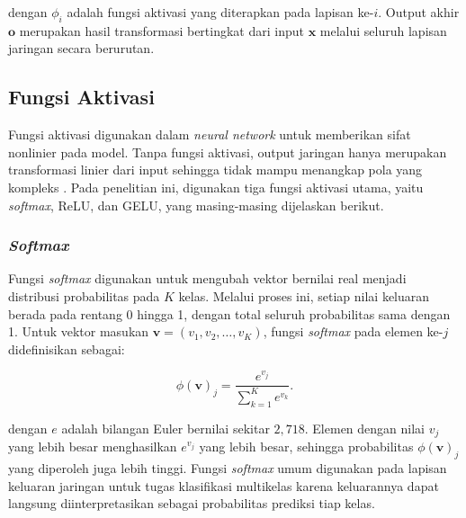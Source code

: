 \noindent dengan $\phi_i$ adalah fungsi aktivasi yang diterapkan pada lapisan
ke-$i$. Output akhir $\mathbf{o}$ merupakan hasil transformasi bertingkat
dari input $\mathbf{x}$ melalui seluruh lapisan jaringan secara berurutan.

\subsection{Fungsi Aktivasi}

Fungsi aktivasi digunakan dalam \textit{neural network} untuk memberikan
sifat nonlinier pada model. Tanpa fungsi aktivasi, output jaringan hanya
merupakan transformasi linier dari input sehingga tidak mampu menangkap
pola yang kompleks \parencite{goodfellow2016}. Pada penelitian ini, digunakan tiga fungsi aktivasi utama,
yaitu \textit{softmax}, ReLU, dan GELU, yang masing-masing dijelaskan
berikut.

\subsubsection{\textit{Softmax}}

Fungsi \textit{softmax} digunakan untuk mengubah vektor bernilai real menjadi 
distribusi probabilitas pada $K$ kelas. Melalui proses ini, setiap nilai keluaran 
berada pada rentang 0 hingga 1, dengan total seluruh probabilitas sama dengan 1. 
Untuk vektor masukan $\mathbf{v} = (v_1, v_2, \ldots, v_K)$, fungsi \textit{softmax}
pada elemen ke-$j$ didefinisikan sebagai:

\vspace{-1em}
\setlength{\abovedisplayskip}{0pt}
\begin{equation}
    \phi(\mathbf{v})_j = \frac{e^{v_j}}{\displaystyle\sum_{k=1}^{K} e^{v_k}}.
    \label{eq:softmax}
\end{equation}

\noindent dengan $e$ adalah bilangan Euler bernilai sekitar $2{,}718$. Elemen dengan nilai $v_j$ 
yang lebih besar menghasilkan $e^{v_j}$ yang
lebih besar, sehingga probabilitas $\phi(\mathbf{v})_j$ yang diperoleh
juga lebih tinggi. Fungsi \textit{softmax} umum digunakan pada
lapisan keluaran jaringan untuk tugas klasifikasi multikelas karena
keluarannya dapat langsung diinterpretasikan sebagai probabilitas prediksi
tiap kelas.

